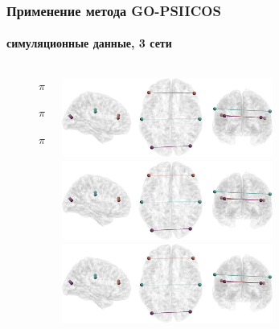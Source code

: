\documentclass[12pt]{beamer}
\begin{document}
\begin{frame}[t]
    \frametitle{Применение метода GO-PSIICOS}
    \framesubtitle{симуляционные данные, 3 сети}
    
\begin{figure}[htbp]
    \centering
    \begin{columns}
        \begin{column}{0.12\textwidth}
            \tiny
            $\pi/20$
            \vspace{1.6cm}

            $\pi/4$
            \vspace{1.6cm}

            $\pi/2 - \pi/20$
        \end{column}
    \hspace{-1cm}
    \begin{column}{0.59\textwidth}
    \centering
        \includegraphics[width=0.7\textwidth]{../images/networks_gopsiicos.jpg}
        \includegraphics[width=0.7\textwidth]{../images/networks_gopsiicos_pi4.jpg}
        \includegraphics[width=0.7\textwidth]{../images/networks_gopsiicos_pi2pi20.jpg}
    \end{column}
    \hspace{-1.2cm}
    \begin{column}{0.39\textwidth}
    \centering

\end{column}
\end{columns}
\end{figure}
\end{frame}
\end{document}
